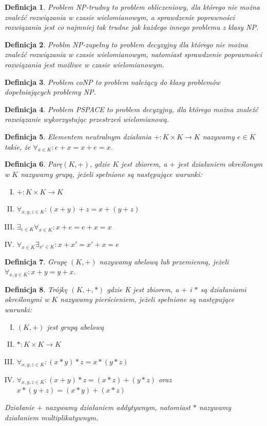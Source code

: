 \documentclass[12pt,a4paper]{article}
\newtheorem{df}{Definicja}[section]
\begin{document}
\begin{df}
Problem NP-trudny to problem obliczeniowy, dla kt\'orego nie mo\.zna znale\'z\'c rozwi\k{a}zania w czasie wielomianowym, a sprawdzenie poprawno\'sci rozwi\k{a}zania jest co najmniej tak trudne jak ka\.zdego innego problemu z klasy NP.
\end{df}
\begin{df}
Problm NP-zupe{\l}ny to problem decyzyjny dla kt\'orego nie mo\.zna znale\'z\'c rozwi\k{a}zania w czasie wielomianowym, natomiast sprawdzenie poprawno\'sci rozwi\k{a}zania jest mo\.zliwe w czasie wielomianowym. 
\end{df}
\begin {df} 
Problem coNP to problem nale\.z\k{a}cy do klasy problem\'ow dope{\l}niaj\k{a}cych problemy NP.
\end{df}
\begin{df}
Problem PSPACE to problem decyzyjny, dla kt\'orego mo\.zna znale\'z\'c rozwi\k{a}zanie wykorzystuj\k{a}c przestrze\'n wielomianow\k{a}.
\end{df}
\begin{df} 
Elementem neutralnym dzia{\l}ania $+:K\times K\rightarrow K$ nazywamy $e\in K$ takie, \.ze $\forall_{x\in K}:e+x=x+e=x$.
\end{df}
\begin{df} 
Par\k{e}$(K,+)$, gdzie $K$ jest zbiorem, a $+$ jest dzia{\l}aniem okre\'slonym w $K$ nazywamy grup\k{a}, je\.zeli spe{\l}nione s\k{a} nast\k{e}puj\k{a}ce warunki:
\begin{enumerate}[I.]
\item $+: K\times K \rightarrow K$
\item $\forall_{x,y,z\in K}: (x+y)+z=x+(y+z)$
\item $\exists_{e\in K} \forall_{x\in K}: x+e=e+x=x$ 
\item $\forall_{x\in K} \exists_{x'\in K}: x+x'=x'+x=e$
\end{enumerate}
\end{df}
\begin{df} 
Grup\k{e} $(K,+)$ nazywamy abelow\k{a} lub przemienn\k{a}, je\.zeli $\forall_{x,y\in K}: x+y=y+x$.
\end{df}
\begin{df} 
Tr\'ojk\k{e} $(K,+,*)$ gdzie K jest zbiorem, a $+$ i $*$ s\k{a} dzia{\l}aniami okre\'slonymi w $K$ nazywamy pier\'scieniem, je\.zeli spe{\l}nione s\k{a} nast\k{e}puj\k{a}ce warunki:
\begin{enumerate}[I.]
\item $(K,+)$ jest grup\k{a} abelow\k{a} 
\item $*:K\times K \rightarrow K$ 
\item $\forall_{x,y,z\in K}: (x*y)*z=x*(y*z)$
\item $\forall_{x,y,z\in K}: (x+y)*z=(x*z)+(y*z)$ oraz $x*(y+z)=(x*y)+(x*z)$
\end{enumerate}
Dzia{\l}anie $+$ nazywamy dzia{\l}aniem addytywnym, natomiast $*$ nazywamy dzia{\l}aniem multiplikatywnym.
\end{df}
\end{document}
